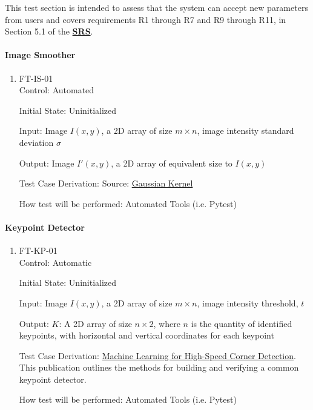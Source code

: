 \documentclass[12pt, titlepage]{article}
\begin{document}
This test section is intended to assess that the system can accept new parameters from users and covers 
requirements R1 through R7 and R9 through R11, in Section 5.1 of the 
\textbf{\href{https://github.com/KiranSingh15/CAS-741-Image-Correspondences/blob/main/docs/SRS/SRS.pdf}
{SRS}}. 
		
\paragraph{Image Smoother}
\begin{enumerate}
\item{FT-IS-01\\}
Control: Automated		

Initial State: Uninitialized

Input: Image $I(x,y)$, a 2D array of size $ m \times n$, image intensity standard deviation $\sigma$

Output: Image $I'(x,y)$, a 2D array of equivalent size to $I(x,y)$

Test Case Derivation: Source: \href{https://pages.stat.wisc.edu/~mchung/teaching/MIA/reading/diffusion.gaussian.kernel.pdf}
{Gaussian Kernel}

How test will be performed: Automated Tools (i.e. Pytest)

\end{enumerate}

\paragraph{Keypoint Detector}
\begin{enumerate}
\item{FT-KP-01\\}
Control: Automatic	

Initial State: Uninitialized			

Input: Image $I(x,y)$, a 2D array of size $ m \times n$, image intensity threshold, $t$

Output: $K$: A 2D array of size $n \times 2$, where $n$ is the quantity of identified keypoints, 
with horizontal and vertical coordinates for each keypoint

Test Case Derivation: \href{https://www.edwardrosten.com/work/rosten_2006_machine.pdf}
{Machine Learning for High-Speed Corner Detection}. This publication outlines the methods for 
building and verifying a common keypoint detector. 

How test will be performed: Automated Tools (i.e. Pytest)
\end{enumerate}
\end{document}
